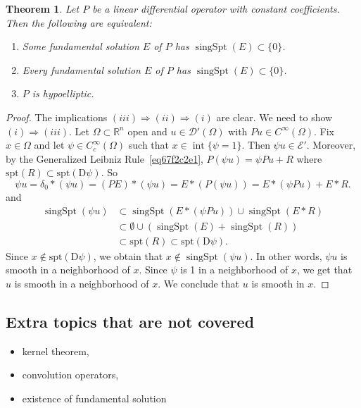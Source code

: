 \documentclass[a4paper,9pt]{amsart}
\newcommand{\scr}[1]{\mathscr{#1}}
\newcommand{\R}{\mathbb{R}}	%
\newcommand{\Diff}{\mathrm{D}}
\newcommand{\THEN}{\Rightarrow}	%
\newcommand{\spt}{\mathrm{spt}}
\newcommand{\singspt}{\operatorname{singSpt}}
\newcommand{\interior}{\operatorname{int}}
\theoremstyle{plain}
\newtheorem{theorem}[proposition]{Theorem}
\theoremstyle{definition}
\theoremstyle{remark}
\begin{document}
\begin{theorem}
	Let $P$ be a linear differential operator with constant coefficients.
	Then the following are equivalent:
	\begin{enumerate}[label=(\roman*)]
	\item Some fundamental solution $E$ of $P$ has $\singspt(E)\subset\{0\}$.
	\item Every fundamental solution $E$ of $P$ has $\singspt(E)\subset\{0\}$.
	\item $P$ is hypoelliptic.
	\end{enumerate}
\end{theorem}
\begin{proof}
	The implications $(iii)\THEN(ii)\THEN(i)$ are clear.
	We need to show $(i)\THEN(iii)$.
	Let $\Omega\subset\R^n$ open and $u\in\scr D'(\Omega)$ with $Pu\in C^\infty(\Omega)$.
	Fix $x\in\Omega$ and let $\psi\in C^\infty_c(\Omega)$ such that $x\in\interior\{\psi=1\}$.
	Then $\psi u\in\scr E'$.
	Moreover, by the Generalized Leibniz Rule~\eqref{eq67f2c2e1}, 
	$P(\psi u) = \psi Pu + R$ where $\spt(R) \subset\spt(\Diff \psi)$.
	So
	\begin{equation}
		\psi u = \delta_0 *(\psi u) = (PE) * (\psi u) = E*(P(\psi u))
		= E*(\psi Pu) + E*R .
	\end{equation}
	and
	\begin{align*}
		\singspt(\psi u) 
		&\subset \singspt(E*(\psi Pu)) \cup \singspt(E*R) \\
		&\subset \emptyset \cup (\singspt(E) + \singspt(R)) \\
		&\subset \spt(R) 
		\subset \spt(\Diff \psi) .
	\end{align*}
	Since $x\notin\spt(\Diff \psi)$, we obtain that $x\notin \singspt(\psi u)$.
	In other words, $\psi u$ is smooth in a neighborhood of $x$.
	Since $\psi$ is 1 in a neighborhood of $x$, we get that $u$ is smooth in a neighborhood of $x$.
	We conclude that $u$ is smooth in $x$.
\end{proof}


\subsection{Extra topics that are not covered}

\begin{itemize}
\item	kernel theorem, 
\item	convolution operators, 
\item	existence of fundamental solution
\end{itemize}
\end{document}

